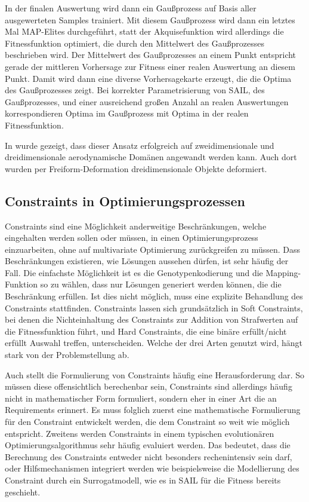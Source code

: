 In der finalen Auswertung wird dann ein Gaußprozess auf Basis aller ausgewerteten Samples trainiert.
Mit diesem Gaußprozess wird dann ein letztes Mal MAP-Elites durchgeführt, statt der Akquisefunktion wird allerdings die Fitnessfunktion optimiert, die durch den Mittelwert des Gaußprozesses beschrieben wird.
Der Mittelwert des Gaußprozesses an einem Punkt entspricht gerade der mittleren Vorhersage zur Fitness einer realen Auswertung an diesem Punkt.
Damit wird dann eine diverse Vorhersagekarte erzeugt, die die Optima des Gaußprozesses zeigt.
Bei korrekter Parametrisierung von SAIL, des Gaußprozesses, und einer ausreichend großen Anzahl an realen Auswertungen korrespondieren Optima im Gaußprozess mit Optima in der realen Fitnessfunktion.

In \cite{Gaier.6152018} wurde gezeigt, dass dieser Ansatz erfolgreich auf zweidimensionale und dreidimensionale aerodynamische Domänen angewandt werden kann.
Auch dort wurden per Freiform-Deformation dreidimensionale Objekte deformiert.


\subsection{Constraints in Optimierungsprozessen}
Constraints sind eine Möglichkeit anderweitige Beschränkungen, welche eingehalten werden sollen oder müssen, in einen Optimierungsprozess einzuarbeiten, ohne auf multivariate Optimierung zurückgreifen zu müssen.
Dass Beschränkungen existieren, wie Lösungen aussehen dürfen, ist sehr häufig der Fall.
Die einfachste Möglichkeit ist es die Genotypenkodierung und die Mapping-Funktion so zu wählen, dass nur Lösungen generiert werden können, die die Beschränkung erfüllen.
Ist dies nicht möglich, muss eine explizite Behandlung des Constraints stattfinden.
Constraints lassen sich grundsätzlich in Soft Constraints, bei denen die Nichteinhaltung des Constraints zur Addition von Strafwerten auf die Fitnessfunktion führt, und Hard Constraints, die eine binäre erfüllt/nicht erfüllt Auswahl treffen, unterscheiden.
Welche der drei Arten genutzt wird, hängt stark von der Problemstellung ab.

Auch stellt die Formulierung von Constraints häufig eine Herausforderung dar.
So müssen diese offensichtlich berechenbar sein, Constraints sind allerdings häufig nicht in mathematischer Form formuliert, sondern eher in einer Art die an Requirements erinnert.
Es muss folglich zuerst eine mathematische Formulierung für den Constraint entwickelt werden, die dem Constraint so weit wie möglich entspricht.
Zweitens werden Constraints in einem typischen evolutionären Optimierungsalgorithmus sehr häufig evaluiert werden. 
Das bedeutet, dass die Berechnung des Constraints entweder nicht besonders rechenintensiv sein darf, oder Hilfsmechanismen integriert werden wie beispielsweise die Modellierung des Constraint durch ein Surrogatmodell, wie es in SAIL für die Fitness bereits geschieht.

